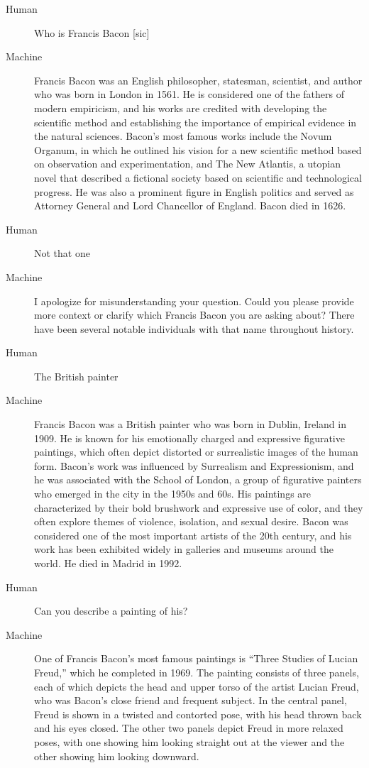 \begin{description}
\item[Human] Who is Francis Bacon [sic]
\item[Machine] Francis Bacon was an English philosopher, statesman, scientist,
    and author who was born in London in 1561. He is considered one of the
    fathers of modern empiricism, and his works are credited with developing the
    scientific method and establishing the importance of empirical evidence in
    the natural sciences. Bacon's most famous works include the Novum Organum,
    in which he outlined his vision for a new scientific method based on
    observation and experimentation, and The New Atlantis, a utopian novel that
    described a fictional society based on scientific and technological
    progress. He was also a prominent figure in English politics and served as
    Attorney General and Lord Chancellor of England. Bacon died in 1626.
\item[Human] Not that one
\item[Machine] I apologize for misunderstanding your question. Could you please
    provide more context or clarify which Francis Bacon you are asking about?
    There have been several notable individuals with that name throughout
    history.
\item[Human] The British painter
\item[Machine] Francis Bacon was a British painter who was born in Dublin,
    Ireland in 1909. He is known for his emotionally charged and expressive
    figurative paintings, which often depict distorted or surrealistic images of
    the human form. Bacon's work was influenced by Surrealism and Expressionism,
    and he was associated with the School of London, a group of figurative
    painters who emerged in the city in the 1950s and 60s. His paintings are
    characterized by their bold brushwork and expressive use of color, and they
    often explore themes of violence, isolation, and sexual desire. Bacon was
    considered one of the most important artists of the 20th century, and his
    work has been exhibited widely in galleries and museums around the world. He
    died in Madrid in 1992.
\item[Human] Can you describe a painting of his?
\item[Machine] One of Francis Bacon's most famous paintings is ``Three Studies
    of Lucian Freud,'' which he completed in 1969. The painting consists of
    three panels, each of which depicts the head and upper torso of the artist
    Lucian Freud, who was Bacon's close friend and frequent subject. In the
    central panel, Freud is shown in a twisted and contorted pose, with his head
    thrown back and his eyes closed. The other two panels depict Freud in more
    relaxed poses, with one showing him looking straight out at the viewer and
    the other showing him looking downward.


\end{description}
